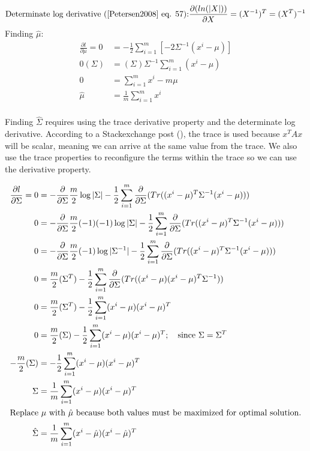 \documentclass[twoside,12pt]{article}
\begin{document}
\begin{enumerate}[label*=\arabic*.]
\begin{align}
    \text{Determinate log derivative (\cite{Petersen2008} eq. 57):} \frac{\partial (ln(|X|))}{\partial X} = (X^{-1})^T = (X^T)^{-1}
\end{align}
Finding $\hat{\mu}$:
\begin{align*}
    \frac{\partial l}{\partial \mu} = 0 &= -\frac{1}{2}\sum_{i=1}^m[-2\Sigma^{-1}(x^i-\mu)] \\
    0 (\Sigma) &= (\Sigma)\Sigma^{-1}\sum_{i=1}^m(x^i-\mu) \\
    0 &= \sum_{i=1}^m x^i - m\mu \\
    \hat{\mu} &= \frac{1}{m}\sum_{i=1}^m x^i\\
\end{align*}

Finding $\hat{\Sigma}$ requires using the trace derivative property and the determinate log derivative. According to a Stackexchange post (\cite{se351550}), the trace is used because $x^TAx$ will be scalar, meaning we can arrive at the same value from the trace. We also use the trace properties to reconfigure the terms within the trace so we can use the derivative property.

\begin{align*}
    \frac{\partial l}{\partial \Sigma} = 0 &= -\frac{\partial}{\partial \Sigma}\frac{m}{2}\log{|\Sigma|} -\frac{1}{2}\sum_{i=1}^m\frac{\partial}{\partial \Sigma}(Tr((x^i-\mu)^T\Sigma^{-1}(x^i-\mu))) \\
    0 &= -\frac{\partial}{\partial \Sigma}\frac{m}{2}(-1)(-1)\log{|\Sigma|} -\frac{1}{2}\sum_{i=1}^m\frac{\partial}{\partial \Sigma}(Tr((x^i-\mu)^T\Sigma^{-1}(x^i-\mu))) \\
    0 &= -\frac{\partial}{\partial \Sigma}\frac{m}{2}(-1)\log{|\Sigma^{-1}|} -\frac{1}{2}\sum_{i=1}^m\frac{\partial}{\partial \Sigma}(Tr((x^i-\mu)^T\Sigma^{-1}(x^i-\mu))) \\
    0 &= \frac{m}{2}(\Sigma^T) -\frac{1}{2}\sum_{i=1}^m\frac{\partial}{\partial \Sigma}(Tr((x^i-\mu)(x^i-\mu)^T\Sigma^{-1})) \\
    0 &= \frac{m}{2}(\Sigma^T) -\frac{1}{2}\sum_{i=1}^m(x^i-\mu)(x^i-\mu)^T \\
    0 &= \frac{m}{2}(\Sigma) -\frac{1}{2}\sum_{i=1}^m(x^i-\mu)(x^i-\mu)^T; \quad \text{since $\Sigma = \Sigma^T$} \\
    -\frac{m}{2}(\Sigma) &= -\frac{1}{2}\sum_{i=1}^m(x^i-\mu)(x^i-\mu)^T\\
    \Sigma &= \frac{1}{m}\sum_{i=1}^m(x^i-\mu)(x^i-\mu)^T\\
    \intertext{Replace $\mu$ with $\hat{\mu}$ because both values must be maximized for optimal solution.}
    \hat{\Sigma} &= \frac{1}{m}\sum_{i=1}^m(x^i-\hat{\mu})(x^i-\hat{\mu})^T\\
\end{align*}


\end{enumerate}
\end{document}
